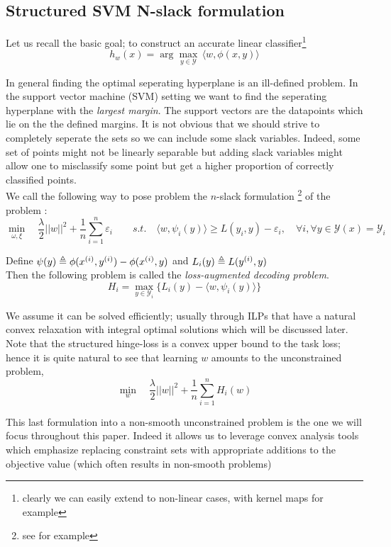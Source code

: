 \subsection{Structured SVM N-slack formulation}
Let us recall the basic goal; to construct an accurate linear
classifier\footnote{clearly we can easily extend to non-linear cases, with kernel maps for example}
\begin{equation}
  h_{w}(x)= \arg\max_{y\in \mathcal Y} \, \langle w, \phi(x,y)\rangle
\end{equation}

In general finding the optimal seperating hyperplane is an ill-defined problem.
In the support vector machine (SVM) setting we want to find the seperating
hyperplane with the \emph{largest margin}. The support vectors are the
datapoints which lie on the the defined margins. It is not obvious
that we should strive to completely seperate the sets so we can include some
slack variables. Indeed, some set of points might not be linearly separable but
adding slack variables might allow one to misclassify some point but get 
a higher proportion of correctly classified points.\\

We call the following way to pose problem the $n$-slack formulation
\footnote{see \citet{moguerzaSupportVectorMachines2006} for example} of the problem :
\begin{equation}
  \min_{\omega, \xi}\quad\frac{\lambda}{2}||w||^{2}+ \frac{1}{n}\sum_{i=1}^{n}\varepsilon_{i}
  \qquad \textit{s.t.} \quad \langle w, \psi_{i}(y)\rangle \geq L(y_{i},y)-
\varepsilon_{i},\quad\forall i ,\forall y \in\mathcal{Y}(x)=\mathcal{Y}_{i}
\end{equation}

Define $\psi(y) \triangleq \phi(x^{(i)},y^{(i)}) - \phi(x^{(i)},y)$ and
$L_i(y) \triangleq L(y^{(i)}, y)$\\

Then the following problem is called the \emph{loss-augmented decoding problem}.
\begin{equation}
H_i = \max_{y\in\mathcal{Y}_{i}} \{L_{i}(y)- \langle w, \psi_{i}(y)\rangle\} 
\end{equation}

We assume it can be solved efficiently; usually through ILPs that have a natural
convex relaxation with integral optimal solutions which will be discussed later. 
Note that the structured hinge-loss is a convex upper bound to the task loss;
hence it is quite natural to see that  learning $w$ amounts to the unconstrained problem,
\begin{equation}
  \min_{w} \quad\frac{\lambda}{2}||w||^{2}+ \frac{1}{n}\sum_{i=1}^{n}H_{i}(w)
  \label{eq:svm-non-smooth}
\end{equation}

This last formulation into a non-smooth unconstrained problem is the one we will
focus throughout this paper. Indeed it allows us to leverage convex analysis
tools which emphasize replacing constraint sets with appropriate additions to
the objective value (which often results in non-smooth problems)

